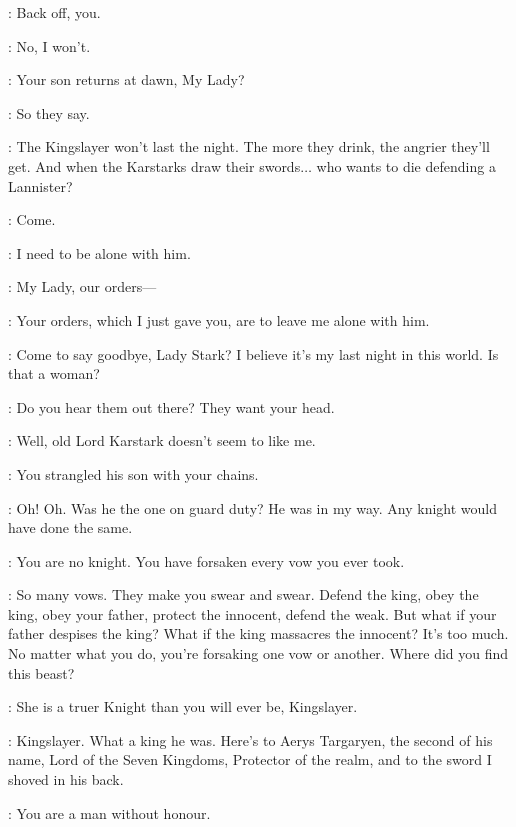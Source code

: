 \SOLDIERb: Back off, you.

\SOLDIERa: No, I won't.


\BRIENNE: Your son returns at dawn, My Lady?

\CATELYN: So they say.

\BRIENNE: The Kingslayer won't last the night. The more they drink, the angrier they'll get. And when the Karstarks draw their swords$\ldots$ who wants to die defending a Lannister?

\CATELYN: Come.


\CATELYN: I need to be alone with him.

\GUARD: My Lady, our orders---

\CATELYN: Your orders, which I just gave you, are to leave me alone with him.


\JAIME: Come to say goodbye, Lady Stark? I believe it's my last night in this world.  Is that a woman?

\CATELYN: Do you hear them out there? They want your head.

\JAIME: Well, old Lord Karstark doesn't seem to like me.

\CATELYN: You strangled his son with your chains.

\JAIME: Oh! Oh. Was he the one on guard duty? He was in my way. Any knight would have done the same.

\CATELYN: You are no knight. You have forsaken every vow you ever took.

\JAIME: So many vows. They make you swear and swear. Defend the king, obey the king, obey your father, protect the innocent, defend the weak. But what if your father despises the king? What if the king massacres the innocent? It's too much. No matter what you do, you're forsaking one vow or another.  Where did you find this beast?

\CATELYN: She is a truer Knight than you will ever be, Kingslayer.

\JAIME: Kingslayer. What a king he was. Here's to Aerys Targaryen, the second of his name, Lord of the Seven Kingdoms, Protector of the realm, and to the sword I shoved in his back.

\CATELYN: You are a man without honour.

